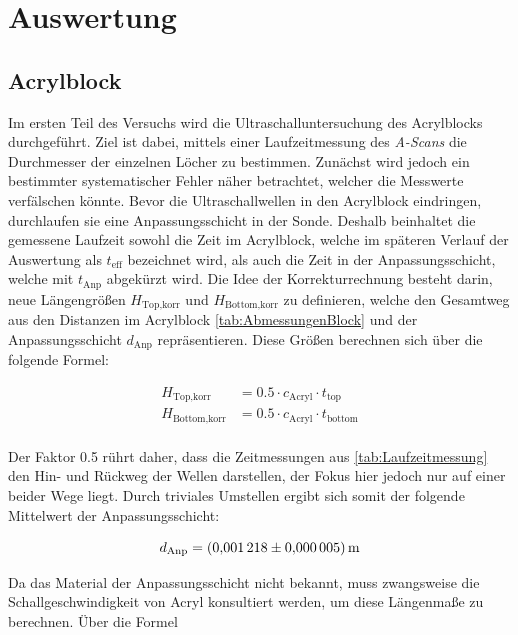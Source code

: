 \section{Auswertung}
\label{sec:Auswertung}

\subsection{Acrylblock}

\noindent Im ersten Teil des Versuchs wird die Ultraschalluntersuchung des Acrylblocks durchgeführt. Ziel ist dabei, mittels 
einer Laufzeitmessung des \emph{A-Scans} die Durchmesser der einzelnen Löcher zu bestimmen. Zunächst wird jedoch ein bestimmter 
systematischer Fehler näher betrachtet, welcher die Messwerte verfälschen könnte. Bevor die Ultraschallwellen in den Acrylblock 
eindringen, durchlaufen sie eine Anpassungsschicht in der Sonde. Deshalb beinhaltet die gemessene Laufzeit sowohl die Zeit im 
Acrylblock, welche im späteren Verlauf der Auswertung als $t_\text{eff}$ bezeichnet wird, als auch die Zeit in der Anpassungsschicht,
welche mit $t_\text{Anp}$ abgekürzt wird. Die Idee der Korrekturrechnung besteht darin, neue Längengrößen $H_\text{Top,korr}$ und $H_\text{Bottom,korr}$
zu definieren, welche den Gesamtweg aus den Distanzen im Acrylblock \ref{tab:AbmessungenBlock} und der Anpassungsschicht $d_\text{Anp}$
repräsentieren. Diese Größen berechnen sich über die folgende Formel:

\begin{align*}
    H_\text{Top,korr} &= 0.5 \cdot c_\text{Acryl} \cdot t_\text{top}\\
    H_\text{Bottom,korr} &= 0.5 \cdot c_\text{Acryl} \cdot t_\text{bottom}\\
\end{align*}

\noindent Der Faktor 0.5 rührt daher, dass die Zeitmessungen aus \ref{tab:Laufzeitmessung} den Hin- und Rückweg der Wellen darstellen,
der Fokus hier jedoch nur auf einer beider Wege liegt. Durch triviales Umstellen ergibt sich somit der folgende Mittelwert der 
Anpassungsschicht:

\begin{equation*}
    d_\text{Anp} = \qty{0.001218\pm0.000005}{\meter}
\end{equation*}

\noindent Da das Material der Anpassungsschicht nicht bekannt, muss zwangsweise die Schallgeschwindigkeit von Acryl konsultiert 
werden, um diese Längenmaße zu berechnen. Über die Formel 

